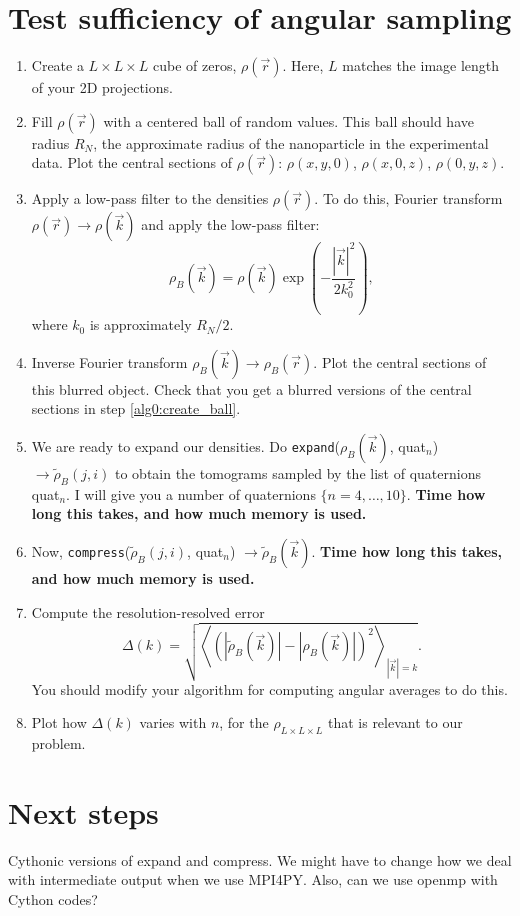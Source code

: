 \documentclass{article}
\begin{document}
\section{Test sufficiency of angular sampling}

\begin{enumerate}
	\item{}Create a $L\times L \times L$ cube of zeros, $\rho(\vec{r})$. Here, $L$ matches the image length of your 2D projections.

	\item{}Fill $\rho(\vec{r})$ with a centered ball of random values. This ball should have radius $R_N$, the approximate radius of the nanoparticle in the experimental data. Plot the central sections of $\rho(\vec{r})$: $\rho(x,y,0)$, $\rho(x,0,z)$, $\rho(0,y,z)$. \label{alg0:create_ball}

	\item{}Apply a low-pass filter to the densities $\rho(\vec{r})$. To do this, Fourier transform $\rho(\vec{r}) \to \rho(\vec{k})$ and apply the low-pass filter:
		\begin{equation}
			\rho_B(\vec{k}) = \rho(\vec{k}) \exp{\left(-\frac{|\vec{k}|^2}{2 k_0^2}\right)}, 
		\end{equation}
		where $k_0$ is approximately $R_N/2$.
		
	\item{}Inverse Fourier transform $\rho_B(\vec{k}) \to \rho_B(\vec{r})$. Plot the central sections of this blurred object. Check that you get a blurred versions of the central sections in step \ref{alg0:create_ball}.

	\item{}We are ready to expand our densities. Do \texttt{expand}($\rho_B(\vec{k})$, quat$_n$) $\to \widetilde{\rho}_B(j,i)$ to obtain the tomograms sampled by the list of quaternions quat$_n$. I will give you a number of quaternions $\{n=4,\ldots,10\}$. {\bf Time how long this takes, and how much memory is used.}
	\item{}Now, \texttt{compress}($\widetilde{\rho}_B(j,i)$, quat$_n$) $\to \widetilde{\rho}_B(\vec{k})$. {\bf Time how long this takes, and how much memory is used.}
	\item{} Compute the resolution-resolved error 
		\begin{equation}
			\Delta(k) = \sqrt{\left\langle \left( |\widetilde{\rho}_B(\vec{k})| - |\rho_B(\vec{k})|\right)^2 \right\rangle_{|\vec{k}| = k}}.
		\end{equation}
		You should modify your algorithm for computing angular averages to do this.
	\item{}Plot how $\Delta(k)$ varies with $n$, for the $\rho_{L\times L \times L}$ that is relevant to our problem.
\end{enumerate}


\section{Next steps}
Cythonic versions of expand and compress.
We might have to change how we deal with intermediate output when we use MPI4PY. 
Also, can we use openmp with Cython codes?
\end{document}
